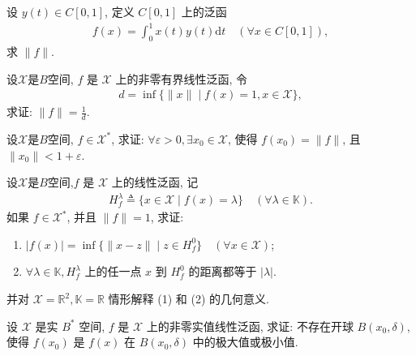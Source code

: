 \documentclass[../../main.tex]{subfiles}%
\begin{document}
\begin{example}
设 $y(t) \in C[0,1]$, 定义 $C[0,1]$ 上的泛函
\begin{align*}
f(x) = \int_{0}^{1} x(t)y(t) \mathrm{d}t \quad (\forall x \in C[0,1]),
\end{align*}
求 $\|f\|$.
\end{example}

\begin{example}
设$\mathscr{X}$是$B$空间, $f$ 是 $\mathscr{X}$ 上的非零有界线性泛函, 令
\begin{align*}
d = \inf \{\|x\| \mid f(x) = 1, x \in \mathscr{X}\},
\end{align*}
求证: $\|f\| = \frac{1}{d}$.
\end{example}

\begin{example}
设$\mathscr{X}$是$B$空间, $f \in \mathscr{X}^*$, 求证: $\forall \varepsilon > 0, \exists x_0 \in \mathscr{X}$, 使得 $f(x_0) = \|f\|$, 且 $\|x_0\| < 1 + \varepsilon$.
\end{example}

\begin{example}
设$\mathscr{X}$是$B$空间,$f$ 是 $\mathscr{X}$ 上的线性泛函, 记
\begin{align*}
H_f^\lambda \triangleq \{x \in \mathscr{X} \mid f(x) = \lambda\} \quad (\forall \lambda \in \mathbb{K}).
\end{align*}
如果 $f \in \mathscr{X}^*$, 并且 $\|f\| = 1$, 求证:
\begin{enumerate}[(1)]
\item $|f(x)| = \inf \{\|x - z\| \mid z \in H_f^0\} \quad (\forall x \in \mathscr{X})$;
\item $\forall \lambda \in \mathbb{K}, H_f^\lambda$ 上的任一点 $x$ 到 $H_f^0$ 的距离都等于 $|\lambda|$.
\end{enumerate}
并对 $\mathscr{X} = \mathbb{R}^2, \mathbb{K} = \mathbb{R}$ 情形解释 (1) 和 (2) 的几何意义.
\end{example}

\begin{proposition}\label{proposition:泛函分析--例题2.1.9}
设 $\mathscr{X}$ 是实 $B^*$ 空间, $f$ 是 $\mathscr{X}$ 上的非零实值线性泛函, 求证: 不存在开球 $B(x_0, \delta)$, 使得 $f(x_0)$ 是 $f(x)$ 在 $B(x_0, \delta)$ 中的极大值或极小值.
\end{proposition}
\end{document}
